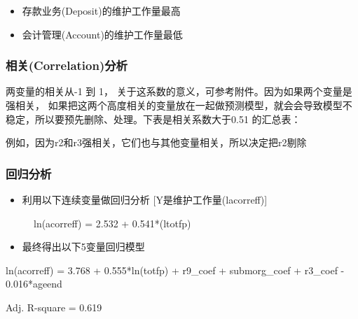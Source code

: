 \begin{itemize}
\tightlist
\item
  存款业务(Deposit)的维护工作量最高
\item
  会计管理(Account)的维护工作量最低
\end{itemize}

\hypertarget{ux76f8ux5173correlationux5206ux6790}{%
\subsubsection{相关(Correlation)分析}\label{ux76f8ux5173correlationux5206ux6790}}

两变量的相关从-1 到 1，
关于这系数的意义，可参考附件。因为如果两个变量是强相关，
如果把这两个高度相关的变量放在一起做预测模型，就会会导致模型不稳定，所以要预先删除、处理。下表是相关系数大于0.51
的汇总表：

例如，因为r2和r3强相关，它们也与其他变量相关，所以决定把r2剔除

\hypertarget{ux56deux5f52ux5206ux6790}{%
\subsubsection{回归分析}\label{ux56deux5f52ux5206ux6790}}

\begin{itemize}
\tightlist
\item
  利用以下连续变量做回归分析 {[}Y是维护工作量(lacorreff){]}
\end{itemize}

\begin{description}
\item[]

ln(acorreff) = 2.532 + 0.541*(ltotfp)

\end{description}

\begin{itemize}
\tightlist
\item
  最终得出以下5变量回归模型
\end{itemize}

\begin{description}
\tightlist
\item[]
ln(acorreff) = 3.768 + 0.555*ln(totfp) + r9\_coef + submorg\_coef +
r3\_coef - 0.016*ageend

\begin{description}
\tightlist
\item[]
Adj. R-square = 0.619
\end{description}
\end{description}

